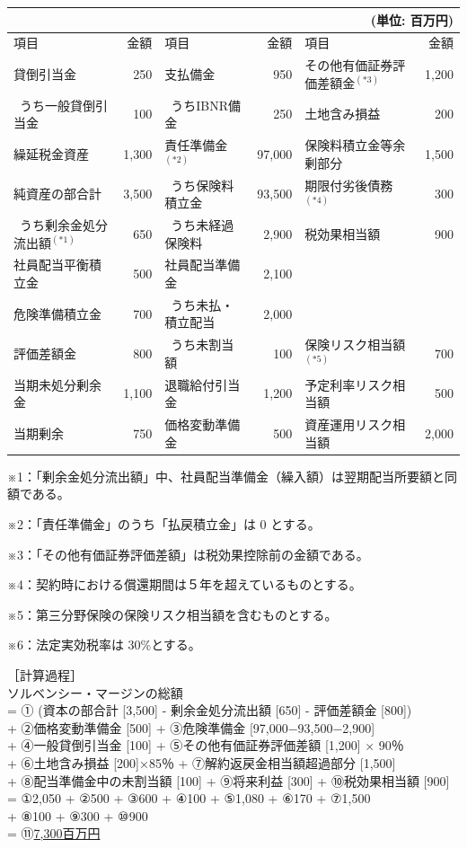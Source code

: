 \documentclass[report,gutter=10mm,fore-edge=10mm,uplatex,dvipdfmx]{jlreq}
\begin{document}
\begin{tabular}{|l|r|l|r|l|r|}
\multicolumn{4}{l}{   }&\multicolumn{2}{r}{(単位: 百万円)}\\  \hline
項目&金額& 項目&金額& 項目&金額 \\ \hline
 貸倒引当金& 250& 支払備金& 950& その他有価証券評価差額金$^{(*3)}$& 1,200\\ \hline
 \ うち一般貸倒引当金& 100& \ うちIBNR備金& 250&土地含み損益& 200\\ \hline
 繰延税金資産& 1,300&責任準備金 $^{(*2)}$& 97,000& 保険料積立金等余剰部分& 1,500\\ \hline
 純資産の部合計& 3,500& \   うち保険料積立金& 93,500&期限付劣後債務$^{(*4)}$& 300\\ \hline
 \ うち剰余金処分流出額$^{(*1)}$& 650& \ うち未経過保険料& 2,900&税効果相当額& 900\\ \hline
 社員配当平衡積立金& 500& 社員配当準備金& 2,100 &&\\ \hline
 危険準備積立金& 700& \ うち未払・積立配当& 2,000 &&\\ \hline
評価差額金& 800& \ うち未割当額& 100 & 保険リスク相当額$^{(*5)}$ & 700\\ \hline
 当期未処分剰余金& 1,100& 退職給付引当金& 1,200&予定利率リスク相当額& 500\\ \hline
 当期剰余& 750&価格変動準備金& 500&資産運用リスク相当額& 2,000\\ \hline
\end{tabular}

※1：「剰余金処分流出額」中、社員配当準備金（繰入額）は翌期配当所要額と同額である。

※2：「責任準備金」のうち「払戻積立金」は 0 とする。

※3：「その他有価証券評価差額」は税効果控除前の金額である。

※4：契約時における償還期間は５年を超えているものとする。

※5：第三分野保険の保険リスク相当額を含むものとする。

※6：法定実効税率は 30\%とする。

\answer{}

［計算過程］\\
ソルベンシー・マージンの総額\\
= ① (資本の部合計 [3,500] - 剰余金処分流出額 [650] - 評価差額金 [800])\\
+ ②価格変動準備金 [500] + ③危険準備金 [97,000−93,500−2,900]\\
+ ④一般貸倒引当金 [100] + ⑤その他有価証券評価差額 [1,200] × 90％\\
+ ⑥土地含み損益 [200]×85％ + ⑦解約返戻金相当額超過部分 [1,500]\\
+ ⑧配当準備金中の未割当額 [100] + ⑨将来利益 [300] + ⑩税効果相当額 [900]\\
= ①2,050 + ②500 + ③600 + ④100 + ⑤1,080 + ⑥170 + ⑦1,500\\
+ ⑧100 + ⑨300 + ⑩900\\
= ⑪\underline{7,300百万円}
\end{document}
